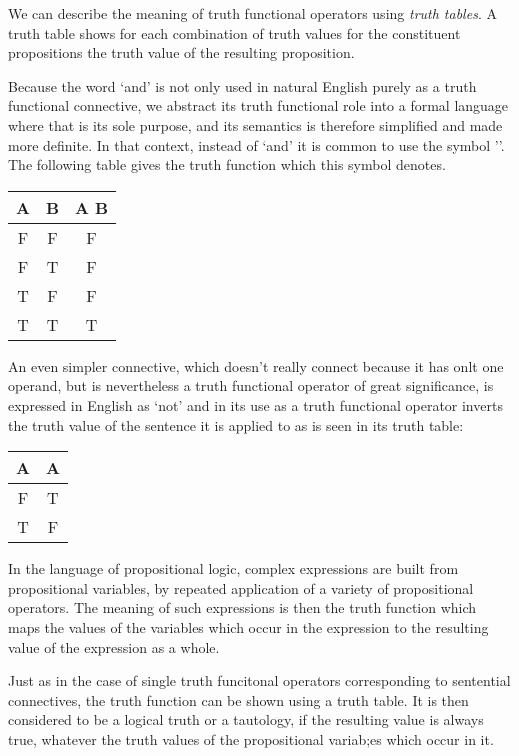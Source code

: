 \documentclass[10pt,titlepage]{book}
\begin{document}
We can describe the meaning of truth functional operators using \emph{truth tables}.
A truth table shows for each combination of truth values for the constituent propositions the truth value of the resulting proposition.

Because the word `and' is not only used in natural English purely as a truth functional connective, we abstract its truth functional role into a formal language where that is its sole purpose, and its semantics is therefore simplified and made more definite.
In that context, instead of `and' it is common to use the symbol '\land'.
The following table gives the truth function which this symbol denotes.

\begin{center}
  \begin{tabular}{c|c|c}
 A & B & A \land{} B\\
 \hline
 F & F & F\\
 F & T & F\\
 T & F & F\\
 T & T & T\\
 \end{tabular}
\end{center}

An even simpler connective, which doesn't really connect because it has onlt one operand, but is nevertheless a truth functional operator of great significance, is expressed in English as `not' and in its use as a truth functional operator inverts the truth value of the sentence it is applied to as is seen in its truth table:


\begin{center}
  \begin{tabular}{c|c}
 A &\lnot{} A\\
 \hline
 F & T\\
 T & F\\
 \end{tabular}
\end{center}


In the language of propositional logic, complex expressions are built from propositional variables, by repeated application of a variety of propositional operators.
The meaning of such expressions is then the truth function which maps the values of the variables which occur in the expression to the resulting value of the expression as a whole.

Just as in the case of single truth funcitonal operators corresponding to sentential connectives, the truth function can be shown using a truth table.
It is then considered to be a logical truth or a tautology, if the resulting value is always true, whatever the truth values of the propositional variab;es which occur in it.
\end{document}
